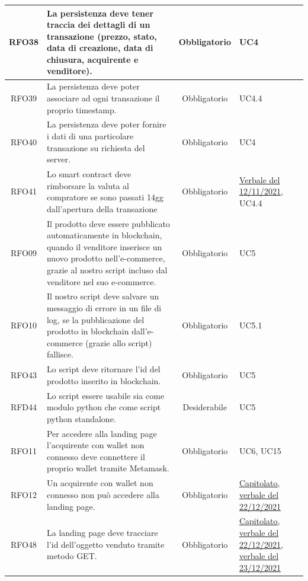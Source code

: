 \documentclass[a4paper, 12pt]{article}
\begin{document}
\begin{longtable}{|c|p{7cm}|c|p{4cm}|}
\hline
RFO38 & La persistenza deve tener traccia dei dettagli di un transazione (prezzo, stato, data di creazione, data di chiusura, acquirente e venditore). & Obbligatorio & UC4 \\
\hline
RFO39 & La persistenza deve poter associare ad ogni transazione il proprio timestamp. & Obbligatorio & UC4.4 \\
\hline
RFO40 & La persistenza deve poter fornire i dati di una particolare transazione su richiesta del server. & Obbligatorio & UC4 \\
\hline
RFO41 & Lo smart contract deve rimborsare la valuta al compratore se sono passati 14gg dall'apertura della transazione & Obbligatorio & \underline{\href{https://github.com/iota97/WinningSoftwareSolution/blob/main/docs/interni/verbali/2021_11_12_E/2021_11_12_E.pdf}{Verbale del 12/11/2021}}, UC4.4 \\
\hline
RFO09 & Il prodotto deve essere pubblicato automaticamente in blockchain, quando il venditore inserisce un nuovo prodotto nell'e-commerce, grazie al nostro script incluso dal venditore nel suo e-commerce. & Obbligatorio & UC5 \\
\hline
RFO10 & Il nostro script deve salvare un messaggio di errore in un file di log, se la pubblicazione del prodotto in blockchain dall'e-commerce (grazie allo script) fallisce. & Obbligatorio & UC5.1 \\
\hline
RFO43 & Lo script deve ritornare l'id del prodotto inserito in blockchain. & Obbligatorio & UC5 \\
\hline
RFD44 & Lo script essere usabile sia come modulo python che come script python standalone. & Desiderabile & UC5 \\
\hline
RFO11 & Per accedere alla landing page l'acquirente con wallet non connesso deve connettere il proprio wallet tramite Metamask. & Obbligatorio & UC6, UC15 \\
\hline
RFO12 & Un acquirente con wallet non connesso non può accedere alla landing page. & Obbligatorio & \underline{\href{https://www.math.unipd.it/~tullio/IS-1/2021/Progetto/C2.pdf}{Capitolato}}, \underline{\href{https://github.com/iota97/WinningSoftwareSolution/blob/main/docs/interni/verbali/2021_12_22_E/2021_12_22_E.pdf}{verbale del 22/12/2021}} \\
\hline
RFO48 & La landing page deve tracciare l'id dell'oggetto venduto tramite metodo GET. & Obbligatorio & \underline{\href{https://www.math.unipd.it/~tullio/IS-1/2021/Progetto/C2.pdf}{Capitolato}}, \underline{\href{https://github.com/iota97/WinningSoftwareSolution/blob/main/docs/interni/verbali/2021_12_22_E/2021_12_22_E.pdf}{verbale del 22/12/2021}}, \underline{\href{https://github.com/iota97/WinningSoftwareSolution/blob/main/docs/interni/verbali/2021_12_23_I/2021_12_23_I.pdf}{verbale del 23/12/2021}} \\

\end{longtable}
\end{document}
